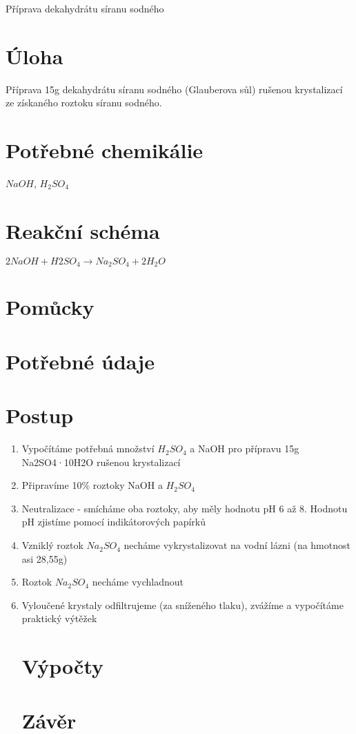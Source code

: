 \documentclass[13pt, a4paper, twoside]{article}
\begin{document}
\begin{center}
    \Huge
    Příprava dekahydrátu síranu sodného
\end{center}
\large \onehalfspacing
\section*{Úloha}
Příprava 15g dekahydrátu síranu sodného (Glauberova sůl) rušenou krystalizací ze
získaného roztoku síranu sodného.
\section*{Potřebné chemikálie}
$NaOH$, $H_2SO_4$
\section*{Reakční schéma}
$2NaOH + H2SO_4 \to Na_2SO_4 + 2H_2O$

\section*{Pomůcky}

\section*{Potřebné údaje}

\section*{Postup}
\begin{enumerate}
    \item Vypočítáme potřebná množství $H_2SO_4$  a NaOH pro přípravu 15g Na2SO4·10H2O rušenou krystalizací
    \item Připravíme 10\% roztoky NaOH a $H_2SO_4$
    \item Neutralizace - smícháme oba roztoky, aby měly hodnotu pH 6 až 8. Hodnotu pH zjistíme pomocí indikátorových papírků
    \item Vzniklý roztok $Na_2SO_4$ necháme vykrystalizovat na vodní lázni (na hmotnost asi 28,55g)
    \item Roztok $Na_2SO_4$ necháme vychladnout
    \item Vyloučené krystaly odfiltrujeme (za sníženého tlaku), zvážíme a vypočítáme praktický výtěžek
    
\section*{Výpočty}

\section*{Závěr}


\end{enumerate}
\end{document}
